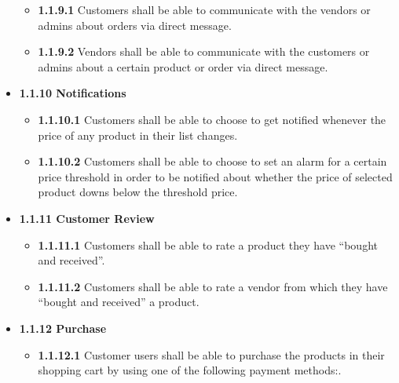 \documentclass[]{article}
\providecommand{\tightlist}{%
  \setlength{\itemsep}{0pt}\setlength{\parskip}{0pt}}
\begin{document}
\begin{itemize}
          \begin{itemize}
              \tightlist
              \item
                    \textbf{1.1.9.1} Customers shall be able to communicate with the
                    vendors or admins about orders via direct message.
              \item
                    \textbf{1.1.9.2} Vendors shall be able to communicate with the
                    customers or admins about a certain product or order via direct
                    message.
          \end{itemize}
    \item
          \textbf{1.1.10 Notifications}

          \begin{itemize}
              \tightlist
              \item
                    \textbf{1.1.10.1} Customers shall be able to choose to get notified
                    whenever the price of any product in their list changes.
              \item
                    \textbf{1.1.10.2} Customers shall be able to choose to set an alarm
                    for a certain price threshold in order to be notified about whether
                    the price of selected product downs below the threshold price.
          \end{itemize}
    \item
          \textbf{1.1.11 Customer Review}

          \begin{itemize}
              \tightlist
              \item
                    \textbf{1.1.11.1} Customers shall be able to rate a product they
                    have ``bought and received''.
              \item
                    \textbf{1.1.11.2} Customers shall be able to rate a vendor from
                    which they have ``bought and received'' a product.
          \end{itemize}
    \item
          \textbf{1.1.12 Purchase}

          \begin{itemize}
              \tightlist
              \item
                    \textbf{1.1.12.1} Customer users shall be able to purchase the
                    products in their shopping cart by using one of the following
                    payment methods:.


\end{itemize}
\end{itemize}
\end{document}
